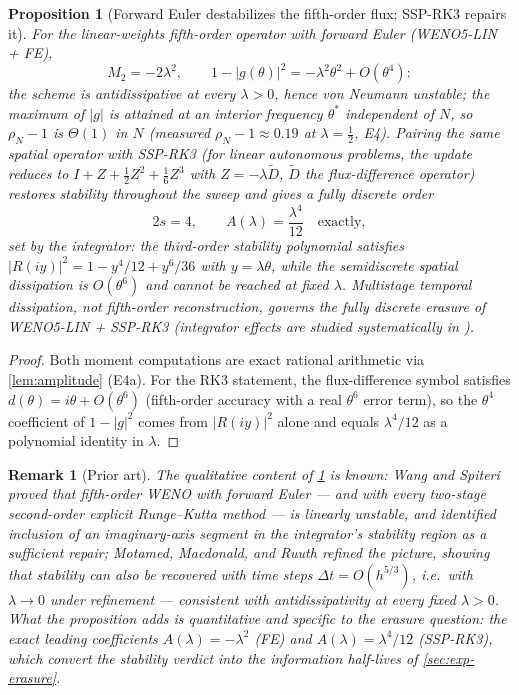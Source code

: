 \documentclass[pdflatex,sn-mathphys-num]{sn-jnl}%
\theoremstyle{thmstyleone}%
\newtheorem{proposition}{Proposition}%
\theoremstyle{thmstyletwo}%
\newtheorem{remark}{Remark}%
\theoremstyle{thmstylethree}%
\begin{document}
\begin{proposition}[Forward Euler destabilizes the fifth-order flux; SSP-RK3 repairs it]\label{prop:weno-fe}
For the linear-weights fifth-order operator with forward Euler (WENO5-LIN + FE), \[ M_2=-2\lambda^2, \qquad 1-|g(\theta)|^2=-\lambda^2\theta^2+O(\theta^4): \] the scheme is antidissipative at every $\lambda>0$, hence von Neumann unstable; the maximum of $|g|$ is attained at an interior frequency $\theta^\ast$ independent of $N$, so $\rho_N-1$ is $\Theta(1)$ in $N$ (measured $\rho_N-1\approx0.19$ at $\lambda=\tfrac12$, E4).
Pairing the same spatial operator with SSP-RK3 (for linear autonomous problems, the update reduces to $I+Z+\tfrac12Z^2+\tfrac16Z^3$ with $Z=-\lambda\tilde D$, $\tilde D$ the flux-difference operator) restores stability throughout the sweep and gives a fully discrete order \[ 2s=4, \qquad A(\lambda)=\frac{\lambda^4}{12} \quad\text{exactly}, \] set by the integrator: the third-order stability polynomial satisfies $|R(iy)|^2=1-y^4/12+y^6/36$ with $y=\lambda\theta$, while the semidiscrete spatial dissipation is $O(\theta^6)$ and cannot be reached at fixed $\lambda$.
Multistage temporal dissipation, not fifth-order reconstruction, governs the fully discrete erasure of WENO5-LIN + SSP-RK3 (integrator effects are studied systematically in \cite{PolemitisChristakisDrikakis2026onestep}).
\end{proposition}

\begin{proof}
Both moment computations are exact rational arithmetic via \cref{lem:amplitude} (E4a).
For the RK3 statement, the flux-difference symbol satisfies $d(\theta)=i\theta+O(\theta^6)$ (fifth-order accuracy with a real $\theta^6$ error term), so the $\theta^4$ coefficient of $1-|g|^2$ comes from $|R(iy)|^2$ alone and equals $\lambda^4/12$ as a polynomial identity in $\lambda$.
\end{proof}

\begin{remark}[Prior art]
The qualitative content of \cref{prop:weno-fe} is known: Wang and Spiteri \cite{WangSpiteri2007} proved that fifth-order WENO with forward Euler --- and with every two-stage second-order explicit Runge--Kutta method --- is linearly unstable, and identified inclusion of an imaginary-axis segment in the integrator's stability region as a sufficient repair; Motamed, Macdonald, and Ruuth \cite{MotamedMacdonaldRuuth2011} refined the picture, showing that stability can also be recovered with time steps $\Delta t=O(h^{5/3})$, i.e.\ with $\lambda\to0$ under refinement --- consistent with antidissipativity at every \emph{fixed} $\lambda>0$.
What the proposition adds is quantitative and specific to the erasure question: the exact leading coefficients $A(\lambda)=-\lambda^2$ (FE) and $A(\lambda)=\lambda^4/12$ (SSP-RK3), which convert the stability verdict into the information half-lives of \cref{sec:exp-erasure}.
\end{remark}
\end{document}
